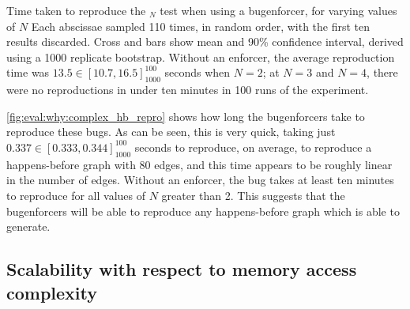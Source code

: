 \begin{sanefig}
  \caption{Time taken to reproduce the $_N$ test
    when using a \gls{bugenforcer}, for varying values of $N$ Each
    abscissae sampled 110 times, in random order, with the first ten
    results discarded.  Cross and bars show mean and 90\% confidence
    interval, derived using a 1000 replicate bootstrap.  Without an
    enforcer, the average reproduction time was $13.5 \in
    [10.7,16.5]_{1000}^{100}$ seconds when $N=2$; at $N=3$ and $N=4$,
    there were no reproductions in under ten minutes in 100 runs of
    the experiment.}
  \label{fig:eval:why:complex_hb_repro}
\end{sanefig}

\autoref{fig:eval:why:complex_hb_repro} shows how long the
\glspl{bugenforcer} take to reproduce these bugs.  As can be seen,
this is very quick, taking just $0.337 \in [0.333,0.344]_{1000}^{100}$
seconds to reproduce, on average, to reproduce a happens-before graph
with 80 edges, and this time appears to be roughly linear in the
number of edges.  Without an enforcer, the bug takes at least ten
minutes to reproduce for all values of $N$ greater than 2.  This
suggests that the \glspl{bugenforcer} will be able to reproduce any
happens-before graph which {\technique} is able to generate.

\subsection{Scalability with respect to memory access complexity}

